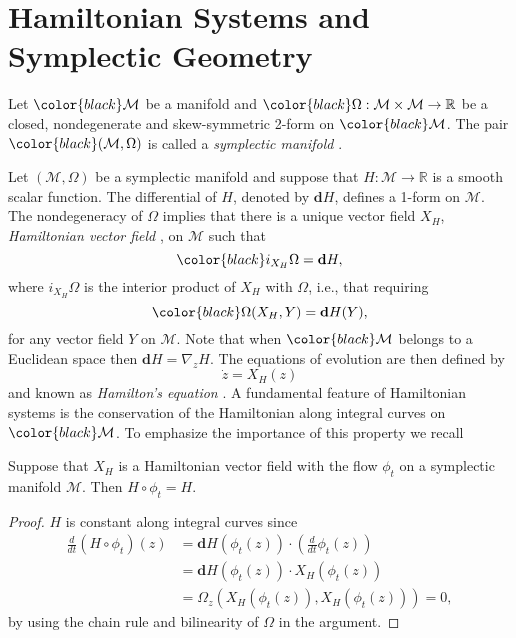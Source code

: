 \documentclass[final]{siamart}
\begin{document}
\section{Hamiltonian Systems and Symplectic Geometry} \label{chap:Hasy:1}
Let ${\color{black}} \mathcal M$ be a manifold and ${\color{black}} \Omega:\mathcal M \times \mathcal M \to \mathbb R$ be a closed, nondegenerate {{\color{black}} and skew-symmetric} 2-form on ${\color{black}} \mathcal M$. The pair ${\color{black}} (\mathcal M,\Omega)$ is called a \emph{symplectic manifold} {{\color{black}} \cite{Marsden:1999ck}}. 

{{\color{black}} Let $(\mathcal M,\Omega)$ be a symplectic manifold and suppose that $H:\mathcal M \to \mathbb R$ is a smooth scalar function. The differential of $H$, denoted by $\mathbf dH$, defines a 1-form on $\mathcal M$. The nondegeneracy of $\Omega$ implies that there is a unique vector field $X_H$, \emph{Hamiltonian vector field }\cite{da2003introduction,Marsden:1999ck}, on $\mathcal M$ such that}
\begin{equation} \label{eq:Hasy:1}
	{\color{black}} i_{X_H} \Omega = \mathbf dH, 
\end{equation}
{{\color{black}} where $i_{X_H} \Omega$ is the interior product of $X_H$ with $\Omega$, i.e., that requiring}
\begin{equation}
	{\color{black}} \Omega(X_H,Y) = \mathbf dH(Y),
\end{equation}
{{\color{black}} for any vector field $Y$ on $\mathcal M$.} Note that when ${\color{black}} \mathcal M$ belongs to a Euclidean space then $\mathbf d H = \nabla_z H$. The equations of evolution are then defined by
\begin{equation} \label{eq:Hasy:2}
	\dot z = X_H(z)
\end{equation}
and known as \emph{Hamilton's equation} \cite{Marsden:1999ck}. A fundamental feature of Hamiltonian systems is the conservation of the Hamiltonian along integral curves on ${\color{black}} \mathcal M$. To emphasize the importance of this property we recall {{\color{black}} \cite{Marsden:1999ck}}

\begin{theorem} \label{theorem:Hasy:1}
Suppose that $X_H$ is a Hamiltonian vector field with the flow $\phi_t$ on a symplectic manifold $\mathcal M$. Then $H\circ \phi_t = H$.
\end{theorem}

\begin{proof}
$H$ is constant along integral curves since
\begin{equation} \label{eq:Hasy:3}
\begin{aligned}
	\frac{d}{dt}(H\circ \phi_t)(z) &= \mathbf d H(\phi_t(z)) \cdot( \frac{d}{dt} \phi_t(z) ) \\
	&= \mathbf d H (\phi_t(z))\cdot X_H(\phi_t(z)) \\
	&= \Omega_z( X_H(\phi_t(z)), X_H(\phi_t(z)) ) = 0,
\end{aligned}
\end{equation}
{{\color{black}} by using} the chain rule and bilinearity of $\Omega$ in the argument.
\end{proof}
\end{document}
